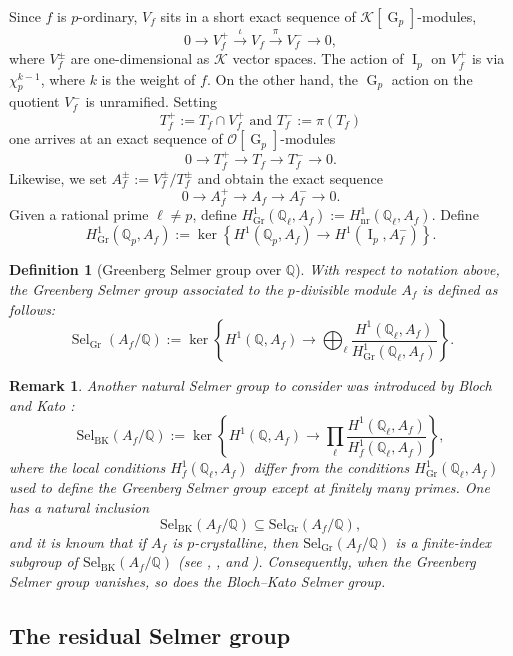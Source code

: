 \documentclass[table]{amsart}
\newtheorem{definition}[theorem]{Definition}
\newtheorem{remark}[theorem]{Remark}
\newcommand{\cK}{\mathcal{K}}
\newcommand{\Q}{\mathbb{Q}}
\newcommand{\cO}{\mathcal{O}}
\newcommand{\Sel}{\mathrm{Sel}}
\newcommand{\Gr}{\mathrm{Gr}}
\newcommand{\op}[1]{\operatorname{#1}}
\numberwithin{equation}{section}
\begin{document}
\par Since $f$ is $p$-ordinary, $V_f$ sits in a short exact sequence of $\cK[\op{G}_p]$-modules, 
\[0\rightarrow V_f^+\xrightarrow{\iota} V_f \xrightarrow{\pi} V_f^-\rightarrow 0, \] where $V_f^\pm$ are one-dimensional as $\cK$ vector spaces. The action of $\op{I}_p$ on $V_f^+$ is via $\chi_p^{k-1}$, where $k$ is the weight of $f$. On the other hand, the $\op{G}_p$ action on the quotient $V_f^-$ is unramified. Setting 
\[T_f^+:=T_f\cap V_f^+\text{ and } T_f^-:=\pi(T_f)\]
one arrives at an exact sequence of $\cO[\op{G}_p]$-modules
\[0\rightarrow T_f^+\rightarrow T_f\rightarrow T_f^-\rightarrow 0.\]
Likewise, we set $A_f^{\pm}:=V_f^\pm/T_f^\pm$ and obtain the exact sequence
\[0\rightarrow A_f^+\rightarrow A_f \rightarrow A_f^-\rightarrow 0.\]
Given a rational prime $\ell\neq p$, define $H^1_{\op{Gr}}(\Q_\ell, A_f):=H^1_{\op{nr}}(\Q_\ell, A_f)$. Define 
\[H^1_{\op{Gr}}(\Q_p, A_f):=\op{ker}\left\{ H^1(\Q_p, A_f)\rightarrow H^1(\op{I}_p, A_f^-)\right\}.\]
\begin{definition}[Greenberg Selmer group over $\Q$]
    With respect to notation above, the Greenberg Selmer group associated to the $p$-divisible module $A_f$ is defined as follows:
    \[\op{Sel}_{\op{Gr}}(A_f/\Q):=\op{ker}\left\{ H^1(\Q, A_f)\rightarrow \bigoplus_\ell \frac{H^1(\Q_\ell, A_f)}{H^1_{\op{Gr}}(\Q_\ell, A_f)} \right\}.\]
\end{definition}
\begin{remark}
Another natural Selmer group to consider was introduced by Bloch and Kato \cite{bloch1990functions}:
\[
    \Sel_{\op{BK}}(A_f/\Q)
    := \ker\!\left\{
        H^1(\Q, A_f)
        \longrightarrow
        \prod_{\ell}
        \frac{H^1(\Q_\ell, A_f)}{H^1_f(\Q_\ell, A_f)}
    \right\},
\]
where the local conditions $H^1_f(\Q_\ell, A_f)$ differ from the conditions $H^1_{\op{Gr}}(\Q_\ell, A_f)$ used to define the Greenberg Selmer group except at finitely many primes. One has a natural inclusion
\[
    \Sel_{\op{BK}}(A_f/\Q) \subseteq \Sel_{\Gr}(A_f/\Q),
\]
and it is known that if $A_f$ is $p$-crystalline, then $\Sel_{\Gr}(A_f/\Q)$ is a finite-index subgroup of $\Sel_{\op{BK}}(A_f/\Q)$ (see \cite[Proposition~4.1(1)]{ochiai2000control}, \cite[(3.1)]{LongoVigni}, and \cite[Theorem~3]{flach}). Consequently, when the Greenberg Selmer group vanishes, so does the Bloch--Kato Selmer group.
\end{remark}
\subsection{The residual Selmer group}
\end{document}
